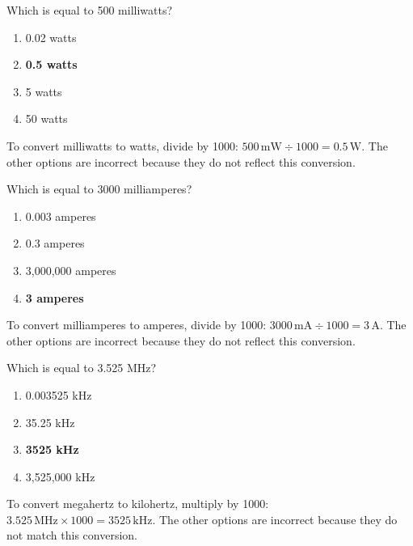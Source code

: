 \begin{tcolorbox}[colback=gray!10!white,colframe=black!75!black,title={T5B05}]
    Which is equal to 500 milliwatts?
    \begin{enumerate}[label=\Alph*),noitemsep]
        \item 0.02 watts
        \item \textbf{0.5 watts}
        \item 5 watts
        \item 50 watts
    \end{enumerate}
\end{tcolorbox}
To convert milliwatts to watts, divide by 1000: \(500 \, \text{mW} \div 1000 = 0.5 \, \text{W}\). The other options are incorrect because they do not reflect this conversion.

\begin{tcolorbox}[colback=gray!10!white,colframe=black!75!black,title={T5B06}]
    Which is equal to 3000 milliamperes?
    \begin{enumerate}[label=\Alph*),noitemsep]
        \item 0.003 amperes
        \item 0.3 amperes
        \item 3,000,000 amperes
        \item \textbf{3 amperes}
    \end{enumerate}
\end{tcolorbox}
To convert milliamperes to amperes, divide by 1000: \(3000 \, \text{mA} \div 1000 = 3 \, \text{A}\). The other options are incorrect because they do not reflect this conversion.

\begin{tcolorbox}[colback=gray!10!white,colframe=black!75!black,title={T5B07}]
    Which is equal to 3.525 MHz?
    \begin{enumerate}[label=\Alph*),noitemsep]
        \item 0.003525 kHz
        \item 35.25 kHz
        \item \textbf{3525 kHz}
        \item 3,525,000 kHz
    \end{enumerate}
\end{tcolorbox}
To convert megahertz to kilohertz, multiply by 1000: \(3.525 \, \text{MHz} \times 1000 = 3525 \, \text{kHz}\). The other options are incorrect because they do not match this conversion.

